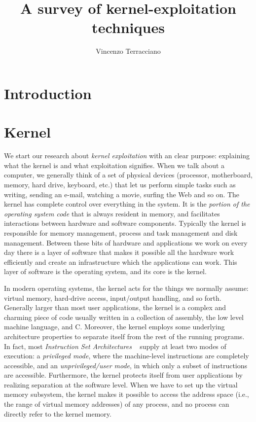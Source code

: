 \documentclass{masterthesis}
\begin{document}
\title{A survey of kernel-exploitation techniques}

\author{Vincenzo Terracciano}


\examiner{_______ ______}

\maketitle

\tableofcontents

\chapter{Introduction}

\chapter{Kernel}
\label{ch:kernel}

We start our research about \emph{kernel exploitation} with an clear purpose: explaining what the kernel is and what exploitation signifies.
When we talk about a computer, we generally think of a set of physical devices (processor, motherboard, memory, hard drive, keyboard, etc.) that let us  perform simple tasks such as writing, sending an e-mail, watching a movie, surfing the Web and so on.
The kernel has complete control over everything in the system. It is the \emph{portion of the operating system code} that is always resident in memory, and facilitates interactions between hardware and software components.
Typically the kernel is responsible for memory management, process and task management and disk management.
Between these bits of hardware and applications we work on every day there is a layer of software that makes it possible all the hardware work efficiently and create an infrastructure which the applications can work.
This layer of software is the operating system, and its core is the kernel.

In modern operating systems, the kernel acts for the things we normally assume: virtual memory, hard-drive access, input/output handling, and so forth. Generally larger than most user applications, the kernel is a complex and charming piece of code usually written in a collection of assembly, the low level machine language, and C.
Moreover, the kernel employs some underlying architecture properties to separate itself from the rest of the running programs.
In fact, most \emph{Instruction Set Architectures} ~\cite{silberman1993architectural} supply at least two modes of execution: a \emph{privileged mode}, where the machine-level instructions are completely accessible, and an \emph{unprivileged/user mode}, in which only a subset of instructions are accessible.
Furthermore, the kernel protects itself from user applications by realizing separation at the software level.
When we have to set up the virtual memory subsystem, the kernel makes it possible to access the address space (i.e., the range of virtual memory addresses) of any process, and no process can directly refer to the kernel memory.\\
\end{document}
